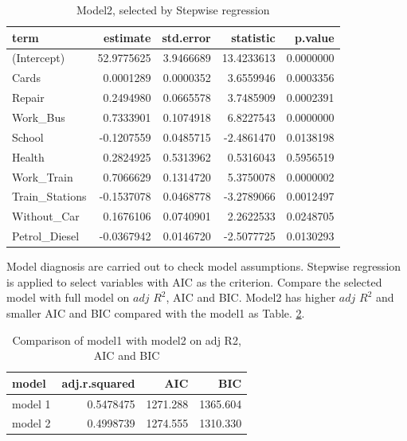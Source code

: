 \documentclass[
]{article}
\begin{document}
\begin{table}

\caption{\label{tab:unnamed-chunk-9}Model2, selected by Stepwise regression\label{tab:model2}}
\centering
\begin{tabular}[t]{l|r|r|r|r}
\hline
term & estimate & std.error & statistic & p.value\\
\hline
(Intercept) & 52.9775625 & 3.9466689 & 13.4233613 & 0.0000000\\
\hline
Cards & 0.0001289 & 0.0000352 & 3.6559946 & 0.0003356\\
\hline
Repair & 0.2494980 & 0.0665578 & 3.7485909 & 0.0002391\\
\hline
Work\_Bus & 0.7333901 & 0.1074918 & 6.8227543 & 0.0000000\\
\hline
School & -0.1207559 & 0.0485715 & -2.4861470 & 0.0138198\\
\hline
Health & 0.2824925 & 0.5313962 & 0.5316043 & 0.5956519\\
\hline
Work\_Train & 0.7066629 & 0.1314720 & 5.3750078 & 0.0000002\\
\hline
Train\_Stations & -0.1537078 & 0.0468778 & -3.2789066 & 0.0012497\\
\hline
Without\_Car & 0.1676106 & 0.0740901 & 2.2622533 & 0.0248705\\
\hline
Petrol\_Diesel & -0.0367942 & 0.0146720 & -2.5077725 & 0.0130293\\
\hline
\end{tabular}
\end{table}

Model diagnosis are carried out to check model assumptions. Stepwise
regression is applied to select variables with AIC as the criterion.
Compare the selected model with full model on \(adj\) \(R^2\), AIC and
BIC. Model2 has higher \(adj\) \(R^2\) and smaller AIC and BIC compared
with the model1 as Table. \ref{tab:com}.

\begin{table}

\caption{\label{tab:unnamed-chunk-10}Comparison of model1 with model2 on adj R2, AIC and BIC\label{tab:com}}
\centering
\begin{tabular}[t]{l|r|r|r}
\hline
model & adj.r.squared & AIC & BIC\\
\hline
model 1 & 0.5478475 & 1271.288 & 1365.604\\
\hline
model 2 & 0.4998739 & 1274.555 & 1310.330\\
\hline
\end{tabular}
\end{table}
\end{document}
